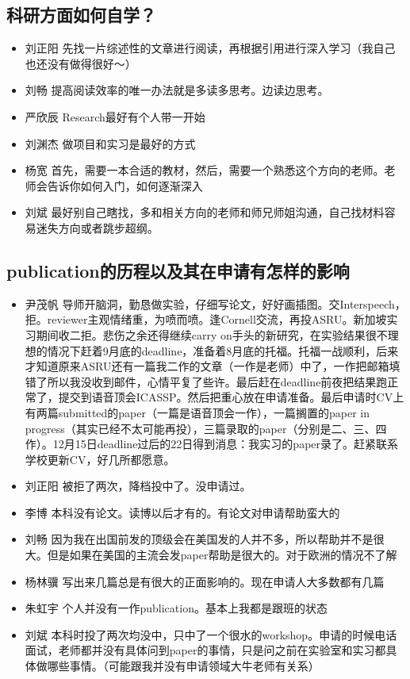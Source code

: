 \documentclass{vivid_layout}
\begin{document}
\subsection{科研方面如何自学？}
\begin{itemize}
\item { 刘正阳}  \quad  先找一片综述性的文章进行阅读，再根据引用进行深入学习（我自己也还没有做得很好～）
\item  { 刘畅}  \quad 提高阅读效率的唯一办法就是多读多思考。边读边思考。
\item  { 严欣辰}  \quad Research最好有个人带一开始
\item  { 刘渊杰}  \quad 做项目和实习是最好的方式
\item  { 杨宽}  \quad 首先，需要一本合适的教材，然后，需要一个熟悉这个方向的老师。老师会告诉你如何入门，如何逐渐深入
\item  { 刘斌}  \quad 最好别自己瞎找，多和相关方向的老师和师兄师姐沟通，自己找材料容易迷失方向或者跳步超纲。

\end{itemize}

\subsection{publication的历程以及其在申请有怎样的影响}
\begin{itemize}
\item  { 尹茂帆} \quad 导师开脑洞，勤恳做实验，仔细写论文，好好画插图。交Interspeech，拒。reviewer主观情绪重，为喷而喷。逢Cornell交流，再投ASRU。新加坡实习期间收二拒。悲伤之余还得继续carry on手头的新研究，在实验结果很不理想的情况下赶着9月底的deadline，准备着8月底的托福。托福一战顺利，后来才知道原来ASRU还有一篇我二作的文章（一作是老师）中了，一作把邮箱填错了所以我没收到邮件，心情平复了些许。最后赶在deadline前夜把结果跑正常了，提交到语音顶会ICASSP。然后把重心放在申请准备。最后申请时CV上有两篇submitted的paper（一篇是语音顶会一作），一篇搁置的paper in progress（其实已经不太可能再投），三篇录取的paper（分别是二、三、四作）。12月15日deadline过后的22日得到消息：我实习的paper录了。赶紧联系学校更新CV，好几所都愿意。
\item  { 刘正阳}  \quad 被拒了两次，降档投中了。没申请过。
\item  { 李博}  \quad 本科没有论文。读博以后才有的。有论文对申请帮助蛮大的
\item  { 刘畅}  \quad 因为我在出国前发的顶级会在美国发的人并不多，所以帮助并不是很大。但是如果在美国的主流会发paper帮助是很大的。对于欧洲的情况不了解
\item  { 杨林骥}  \quad 写出来几篇总是有很大的正面影响的。现在申请人大多数都有几篇
\item  { 朱虹宇}  \quad 个人并没有一作publication。基本上我都是跟班的状态
\item  { 刘斌}  \quad 本科时投了两次均没中，只中了一个很水的workshop。申请的时候电话面试，老师都并没有具体问到paper的事情，只是问之前在实验室和实习都具体做哪些事情。（可能跟我并没有申请领域大牛老师有关系）
\end{itemize}
\end{document}
